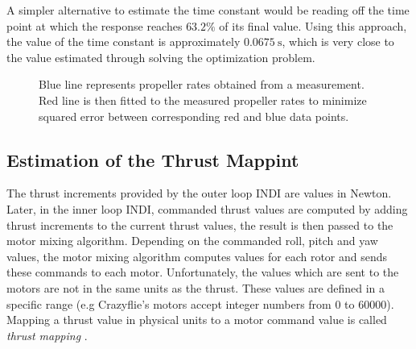 \documentclass[11pt, a4paper, twoside]{report}
\begin{document}
A simpler alternative to estimate the time constant would be reading off the time point at which the response reaches $63.2 \%$ of its final value. Using this approach, the value of the time constant is approximately $0.0675~\si{\second}$, which is very close to the value estimated through solving the optimization problem.

\begin{figure}[h]
	\centering 
	\captionsetup{justification=centering, singlelinecheck=off, font=bf, belowskip=-0.5cm}
	\caption[Fitting first order lag element to propeller rates measurement]{Blue line represents propeller rates obtained from a measurement. Red line is then fitted to the measured propeller rates to minimize squared error between corresponding red and blue data points. }
	\label{fig:actuator_dynamics_est}
\end{figure}

\subsection{Estimation of the Thrust Mappint} \label{subsec:thrust_mapping}

The thrust increments provided by the outer loop \acrshort{INDI} are values in  Newton. Later, in the inner loop \acrshort{INDI}, commanded thrust values are computed by adding thrust increments to the current thrust values, the result is then passed to the motor mixing algorithm. Depending on the commanded roll, pitch and yaw values, the motor mixing algorithm computes values for each rotor and sends these commands to each motor. Unfortunately, the values which are sent to the motors are not in the same units as the thrust. These values are defined in a specific range (e.g Crazyflie's motors accept integer numbers from $0$ to $60000$). Mapping a thrust value in physical units to a motor command value is called \textit{thrust mapping} \cite{faessler}.
\end{document}
